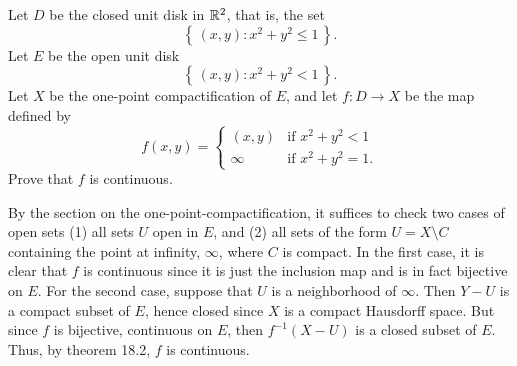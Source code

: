 \begin{problem}
  Let \(D\) be the closed unit disk in \(\mathbb{R}^2\), that is, the set
  \[
    \left\{\,(x,y):x^2+y^2\leq 1\,\right\}.
  \]
  Let \(E\) be the open unit disk
  \[
    \left\{\,(x,y):x^2+y^2<1\,\right\}.
  \]
  Let \(X\) be the one-point compactification of \(E\), and let
  \(f\colon D\to X\) be the map defined by
  \[
    f(x,y)=
    \begin{cases}
      (x,y)&\text{if \(x^2+y^2<1\)}\\
      \infty&\text{if \(x^2+y^2=1\).}
    \end{cases}
  \]
  Prove that \(f\) is continuous.
\end{problem}
\begin{solution}
  By the section on the one-point-compactification, it suffices to check
  two cases of open sets (1) all sets \(U\) open in \(E\), and (2) all sets
  of the form \(U=X\setminus C\) containing the point at infinity,
  \(\infty\), where \(C\) is compact. In the first case, it is clear that
  \(f\) is continuous since it is just the inclusion map and is in fact
  bijective on \(E\). For the second case, suppose that \(U\) is a
  neighborhood of \(\infty\). Then \(Y-U\) is a compact subset of \(E\),
  hence closed since \(X\) is a compact Hausdorff space. But since \(f\) is
  bijective, continuous on \(E\), then \(f^{-1}(X-U)\) is a closed subset
  of \(E\). Thus, by theorem 18.2, \(f\) is continuous.
\end{solution}

